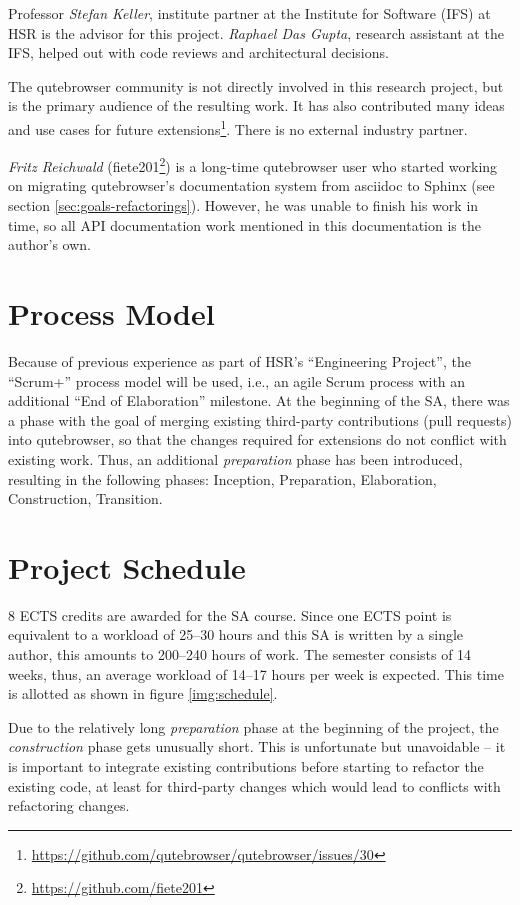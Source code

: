 Professor \emph{Stefan Keller}, institute partner at the Institute for Software
(IFS) at HSR is the advisor for this project. \emph{Raphael Das Gupta}, research
assistant at the IFS, helped out with code reviews and architectural decisions.

The qutebrowser community is not directly involved in this research project, but
is the primary audience of the resulting work. It has also contributed many
ideas and use cases for future
extensions\footnote{\url{https://github.com/qutebrowser/qutebrowser/issues/30}}.
There is no external industry partner.

\label{fiete}
\emph{Fritz Reichwald} (fiete201\footnote{\url{https://github.com/fiete201}})
is a long-time qutebrowser user who started working on migrating qutebrowser's
documentation system from asciidoc to Sphinx (see section
\ref{sec:goals-refactorings}). However, he was unable to finish his work in
time, so all API documentation work mentioned in this documentation is the
author's own.

\section{Process Model}
Because of previous experience as part of HSR's ``Engineering Project'', the
``Scrum+'' process model will be used, i.e., an agile Scrum process with an
additional ``End of Elaboration'' milestone. At the beginning of the SA, there was a phase with the goal of merging existing
third-party contributions (pull requests) into qutebrowser, so that the changes
required for extensions do not conflict with existing work. Thus, an additional
\emph{preparation} phase has been introduced, resulting in the following phases:
Inception, Preparation, Elaboration, Construction, Transition.

\section{Project Schedule}
\label{schedule}

8 ECTS credits are awarded for the SA course. Since one ECTS point is equivalent
to a workload of 25--30 hours \autocite{ects} and this SA is written by a single
author, this amounts to 200--240 hours of work. The semester consists of 14
weeks, thus, an average workload of 14--17 hours per week is expected. This time
is allotted as shown in figure \ref{img:schedule}.

Due to the relatively long \emph{preparation} phase at the beginning of the
project, the \emph{construction} phase gets unusually short. This is
unfortunate but unavoidable -- it is important to integrate existing
contributions before starting to refactor the existing code, at least for
third-party changes which would lead to conflicts with refactoring changes.

